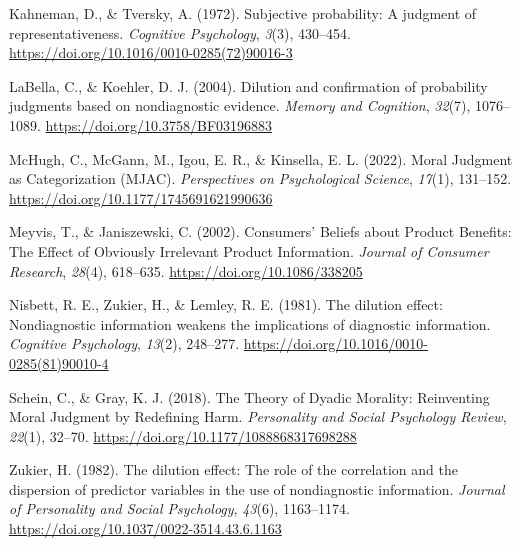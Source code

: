 \documentclass[
  man,floatsintext]{apa6}
\newlength{\cslhangindent}
\newenvironment{CSLReferences}[2] %
 {\begin{list}{}{%
  \setlength{\itemindent}{0pt}
  \setlength{\leftmargin}{0pt}
  \setlength{\parsep}{0pt}
  \ifodd #1
   \setlength{\leftmargin}{\cslhangindent}
   \setlength{\itemindent}{-1\cslhangindent}
  \fi
  \setlength{\itemsep}{#2\baselineskip}}}
 {\end{list}}
\begin{document}
\begin{CSLReferences}{1}{0}
Kahneman, D., \& Tversky, A. (1972). Subjective probability: {A} judgment of representativeness. \emph{Cognitive Psychology}, \emph{3}(3), 430--454. \url{https://doi.org/10.1016/0010-0285(72)90016-3}

LaBella, C., \& Koehler, D. J. (2004). Dilution and confirmation of probability judgments based on nondiagnostic evidence. \emph{Memory and Cognition}, \emph{32}(7), 1076--1089. \url{https://doi.org/10.3758/BF03196883}

McHugh, C., McGann, M., Igou, E. R., \& Kinsella, E. L. (2022). Moral {Judgment} as {Categorization} ({MJAC}). \emph{Perspectives on Psychological Science}, \emph{17}(1), 131--152. \url{https://doi.org/10.1177/1745691621990636}

Meyvis, T., \& Janiszewski, C. (2002). Consumers' {Beliefs} about {Product Benefits}: {The Effect} of {Obviously Irrelevant Product Information}. \emph{Journal of Consumer Research}, \emph{28}(4), 618--635. \url{https://doi.org/10.1086/338205}

Nisbett, R. E., Zukier, H., \& Lemley, R. E. (1981). The dilution effect: {Nondiagnostic} information weakens the implications of diagnostic information. \emph{Cognitive Psychology}, \emph{13}(2), 248--277. \url{https://doi.org/10.1016/0010-0285(81)90010-4}

Schein, C., \& Gray, K. J. (2018). The {Theory} of {Dyadic Morality}: {Reinventing Moral Judgment} by {Redefining Harm}. \emph{Personality and Social Psychology Review}, \emph{22}(1), 32--70. \url{https://doi.org/10.1177/1088868317698288}

Zukier, H. (1982). The dilution effect: {The} role of the correlation and the dispersion of predictor variables in the use of nondiagnostic information. \emph{Journal of Personality and Social Psychology}, \emph{43}(6), 1163--1174. \url{https://doi.org/10.1037/0022-3514.43.6.1163}

\end{CSLReferences}
\end{document}
